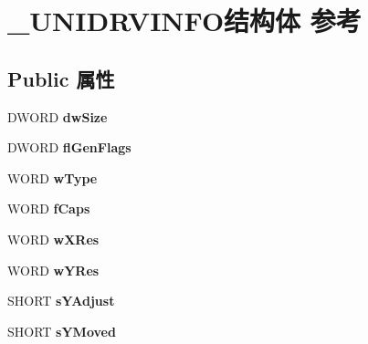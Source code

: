\hypertarget{struct___u_n_i_d_r_v_i_n_f_o}{}\section{\+\_\+\+U\+N\+I\+D\+R\+V\+I\+N\+F\+O结构体 参考}
\label{struct___u_n_i_d_r_v_i_n_f_o}
\subsection*{Public 属性}
\begin{DoxyCompactItemize}
\item 
\mbox{\label{struct___u_n_i_d_r_v_i_n_f_o_acaa84b306a379d0f56f1a4a34dd9fd84}} 
D\+W\+O\+RD {\bfseries dw\+Size}
\item 
\mbox{\label{struct___u_n_i_d_r_v_i_n_f_o_afc589d180e3aecdb6f433cd17ebc4796}} 
D\+W\+O\+RD {\bfseries fl\+Gen\+Flags}
\item 
\mbox{\label{struct___u_n_i_d_r_v_i_n_f_o_afc0693d5365ef74fcdd9b18d72ded783}} 
W\+O\+RD {\bfseries w\+Type}
\item 
\mbox{\label{struct___u_n_i_d_r_v_i_n_f_o_a2c6be61f1d43aac591ffadcb9466745f}} 
W\+O\+RD {\bfseries f\+Caps}
\item 
\mbox{\label{struct___u_n_i_d_r_v_i_n_f_o_a0a64d8301559a2a1e258693ea046da0d}} 
W\+O\+RD {\bfseries w\+X\+Res}
\item 
\mbox{\label{struct___u_n_i_d_r_v_i_n_f_o_a33b135dd80a32be9e9b3aac34a2199d6}} 
W\+O\+RD {\bfseries w\+Y\+Res}
\item 
\mbox{\label{struct___u_n_i_d_r_v_i_n_f_o_aee1b4cea403532cf3e040fff4d3e816d}} 
S\+H\+O\+RT {\bfseries s\+Y\+Adjust}
\item 
\mbox{\label{struct___u_n_i_d_r_v_i_n_f_o_a2c8d44b98282faec3180548525d9849c}} 
S\+H\+O\+RT {\bfseries s\+Y\+Moved}
\item 
\mbox{\label{struct___u_n_i_d_r_v_i_n_f_o_ae51f2e50917a6578f4b55a4978521e74}} 

\end{DoxyCompactItemize}
